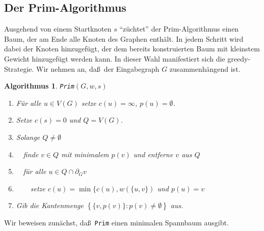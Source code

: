 \documentclass[10pt,reqno]{amsart}
\numberwithin{equation}{section}
\newtheorem{algorithm}[definition]{Algorithmus}
\newcommand\cbc[1]{\left\{{#1}\right\}}
\begin{document}
\subsection{Der Prim-Algorithmus}\label{sec_prim}
Ausgehend von einem Startknoten $s$ ``z\"uchtet'' der Prim-Algorithmus einen Baum, der am Ende alle Knoten des Graphen enth\"alt.
In jedem Schritt wird dabei der Knoten hinzugef\"ugt, der dem bereits konstruierten Baum mit kleinstem Gewicht hinzugef\"ugt werden kann.
In dieser Wahl manifestiert sich die greedy-Strategie.
Wir nehmen an, da\ss\ der Eingabegraph $G$ zusammenh\"angend ist.

\begin{algorithm}{\tt Prim}$(G,w,s)$
	\begin{enumerate}
		\item F\"ur alle $u\in V(G)$ setze $c(u)=\infty$, $p(u)=\emptyset$.
		\item Setze $c(s)=0$ und $Q=V(G)$.
		\item Solange $Q\neq\emptyset$
		\item $\quad$finde $v\in Q$ mit minimalem $p(v)$ und entferne $v$ aus $Q$
		\item $\quad$f\"ur alle $u\in Q\cap\partial_Gv$
		\item $\quad\quad$setze $c(u)=\min\{c(u),w(\{u,v\})$ und $p(u)=v$
		\item Gib die Kantenmenge $\cbc{\{v,p(v)\}:p(v)\neq\emptyset}$ aus.
	\end{enumerate}
\end{algorithm}

Wir beweisen zun\"achst, da\ss\ {\tt Prim} einen minimalen Spannbaum ausgibt.
\end{document}

